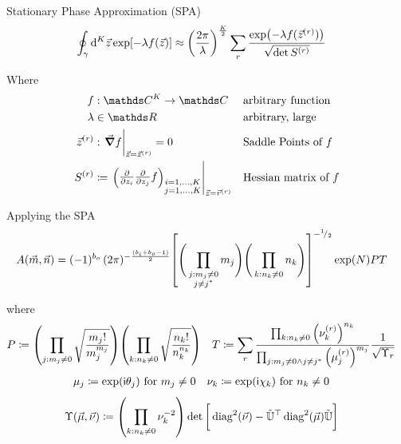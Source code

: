 
\begin{frame}{Stationary Phase Approximation (SPA)}
%
\begin{align*}
	\oint_{\gamma} \dd[K]{\vec{z}}
		\exp[-\lambda f(\vec{z})]
&\approx
	\qty( \frac
		{2\pi}
		{\lambda}
	)^{\frac{K}{2}}
	\sum_{r}
		\frac
		{\exp(-\lambda f(\vec{z}^{(r)}))}
		{\sqrt{\det S^{(r)}}}
\end{align*}

Where
\begin{align*}
	f &: \setComplex^{K} \to \setComplex 													&& \text{arbitrary function} \\
	\lambda & \in \setReals																				&& \text{arbitrary, large} \\
	\vec{z}^{(r)} &: \eval{\grad f}_{\vec{z} = \vec{z}^{(r)}} = 0		&& \text{Saddle Points of } f \\
	S^{(r)} &\coloneqq
		\eval{
		\mqty(
			\pdv{z_i} \pdv{z_j} f
		)_{\substack{
				i=1, \ldots, K\\
				j=1, \ldots, K
			}}
		}_{\vec{z} = \vec{r}^{(r)}}
	&& \text{Hessian matrix of }f
\end{align*}
%
\end{frame}


\begin{frame}{Applying the SPA}
%
\vspace{-15pt}
\begin{align*}
	A(\vec{m}, \vec{n})
&=
	(-1)^{b_o} \,	
	(2\pi)^{-\frac{(b_i + b_o - 1)}{2}}
	\qty[
		{\Bigg(} \prod_{\substack{j : m_j \neq 0\\j \neq j^*}} m_j {\Bigg)}
		{\Bigg(} \prod_{          k : n_k \neq 0             } n_k {\Bigg)}
	]^{-{}^ {1} \!/_ {2}}
	\exp(N) PT
\end{align*}

where
\begin{align*}
	P
&\coloneqq
	\qty( \prod_{j : m_j \neq 0}
		\sqrt{\frac
			{ m_j! }
			{ m_j^{m_j} }
		}
	)
	\qty( \prod_{k : n_k \neq 0}
		\sqrt{\frac
			{ n_k! }
			{ n_k^{n_k} }
		}
	)
&
	T
&\coloneqq
	\sum_{r}	
		\frac
			{\prod_{k : n_k \neq 0}                  \qty(\nu_k^{(r)})^{n_k}}
			{\prod_{j : m_j \neq 0 \land j \neq j^*} \qty(\mu_j^{(r)})^{m_j}}
		\frac{1}{\sqrt{\Upsilon_r}}
\end{align*}
%
\begin{align*}
	\mu_j
&\coloneqq
	\exp(\mathsf{i} \theta_j) \text{ for } m_j \neq 0
&
	\nu_k
&\coloneqq
	\exp(\mathsf{i} \chi  _k) \text{ for } n_k \neq 0
\end{align*}
%
\begin{align*}
	\Upsilon(\vec{\mu}, \vec{\nu})
&\coloneqq
	\qty( \prod_{k: n_k \neq 0} \nu_k^{-2} )
		\det\qty[\bigg.
				\operatorname{diag}^2(\vec{\nu})
			-
			\tilde{\mathbb{U}}^\top
			\operatorname{diag}^2(\vec{\mu})
			\tilde{\mathbb{U}}
		]
\end{align*}
%
\end{frame}

